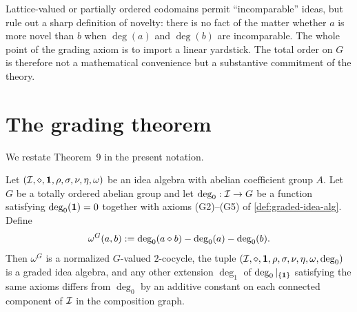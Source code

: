 \begin{remark}
Lattice-valued or partially ordered codomains permit ``incomparable''
ideas, but rule out a sharp definition of novelty: there is no fact of
the matter whether $a$ is more novel than $b$ when $\deg(a)$ and
$\deg(b)$ are incomparable. The whole point of the grading axiom is to
import a linear yardstick. The total order on $G$ is therefore not a
mathematical convenience but a substantive commitment of the theory.
\end{remark}

\section{The grading theorem}\label{sec:grading-theorem}

We restate Theorem~9 in the present notation.

\begin{theorem}\label{thm:grading}
Let $(\mathcal{I},\mathbin{\diamond},\mathbf{1},\rho,\sigma,\nu,\eta,\omega)$
be an idea algebra with abelian coefficient group $A$. Let $G$ be a
totally ordered abelian group and let $\deg_0 : \mathcal{I} \to G$ be a
function satisfying $\deg_0(\mathbf{1}) = 0$ together with axioms
\textup{(G2)--(G5)} of \cref{def:graded-idea-alg}. Define
\[
  \omega^G(a,b) \mathrel{:=} \deg_0(a\mathbin{\diamond} b) - \deg_0(a) - \deg_0(b).
\]
Then $\omega^G$ is a normalized $G$-valued $2$-cocycle, the tuple
$(\mathcal{I},\mathbin{\diamond},\mathbf{1},\rho,\sigma,\nu,\eta,\omega,\deg_0)$
is a graded idea algebra, and any other extension $\deg_1$ of
$\deg_0|_{\{\mathbf{1}\}}$ satisfying the same axioms differs from
$\deg_0$ by an additive constant on each connected component of
$\mathcal{I}$ in the composition graph.
\end{theorem}

